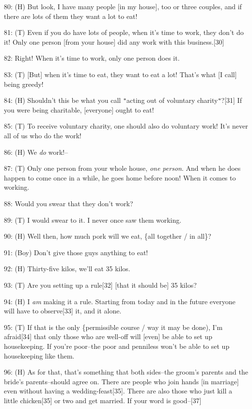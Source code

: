 80: (H) But look, I have many people [in my house], too or three couples, and if
there are lots of them they want a lot to eat!

81: (T) Even if you do have lots of people, when it's time to work, they don't
do it! Only one person [from your house] did any work with this business.[30]

82: Right! When it's time to work, only one person does it.

83: (T) [But] when it's time to eat, they want to eat a lot! That's what [I call]
being greedy!

84: (H) Shouldn't this be what you call \texttt{"}acting out of voluntary charity\texttt{"}?[31]
If you were being charitable, [everyone] ought to eat!

85: (T) To receive voluntary charity, one should also do voluntary work! It's never
all of us who do the work!

86: (H) We \textit{do }work!--

87: (T) Only one person from your whole house, \textit{one person}. And when he
does happen to come once in a while, he goes home before noon! When it comes to
working.

88: Would you swear that they don't work?

89: (T) I would swear to it. I never once saw them working.

90: (H) Well then, how much pork will we eat, \{all together / in all\}?

91: (Boy) Don't give those guys anything to eat!

92: (H) Thirty-five kilos, we'll eat 35 kilos.

93: (T) Are you setting up a rule[32] [that it should be] 35 kilos?

94: (H) I \textit{am} making it a rule. Starting from today and in the future everyone
will have to observe[33] it, and it alone.

95: (T) If that is the only \{permissible course / way it may be done), I'm afraid[34]
that only those who are well-off will [even] be able to set up housekeeping. If
you're poor--the poor and penniless won't be able to set up housekeeping like them.

96: (H) As for that, that's something that both sides--the groom's parents and
the bride's parents--should agree on. There are people who join hands [in marriage]
even without having a wedding-feast[35]. There are also those who just kill a little
chicken[35] or two and get married. If your word is good--[37]

